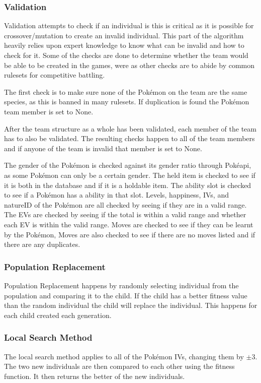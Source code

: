 \documentclass[a4paper]{article}
\newcommand{\Pokemon}{Pok\'{e}mon}
\newcommand{\Pokeapi}{Pok\'{e}api}
\begin{document}
\subsubsection{Validation}
\par
Validation attempts to check if an individual is this is critical as it is possible for crossover/mutation to create an invalid individual.
This part of the algorithm heavily relies upon expert knowledge to know what can be invalid and how to check for it.
Some of the checks are done to determine whether the team would be able to be created in the games, were as other checks are to abide by common rulesets for competitive battling.
\par
The first check is to make sure none of the \Pokemon{} on the team are the same species, as this is banned in many rulesets.
If duplication is found the \Pokemon{} team member is set to None.
\\ \par
After the team structure as a whole has been validated, each member of the team has to also be validated.
The resulting checks happen to all of the team members and if anyone of the team is invalid that member is set to None.
\par
The gender of the \Pokemon{} is checked against its gender ratio through \Pokeapi{}, as some \Pokemon{} can only be a certain gender.
The held item is checked to see if it is both in the database and if it is a holdable item.
The ability slot is checked to see if a \Pokemon{} has a ability in that slot.
Levels, happiness, IVs, and natureID of the \Pokemon{} are all checked by seeing if they are in a valid range.
The EVs are checked by seeing if the total is within a valid range and whether each EV is within the valid range.
Moves are checked to see if they can be learnt by the \Pokemon{}, Moves are also checked to see if there are no moves listed and if there are any duplicates.
\subsubsection{Population Replacement}
\par
Population Replacement happens by randomly selecting individual from the population and comparing it to the child.
If the child has a better fitness value than the random individual the child will replace the individual.
This happens for each child created each generation.
\subsubsection{Local Search Method}
\par
The local search method applies to all of the \Pokemon{} IVs, changing them by $\pm 3$.
The two new individuals are then compared to each other using the fitness function.
It then returns the better of the new individuals.
\end{document}
